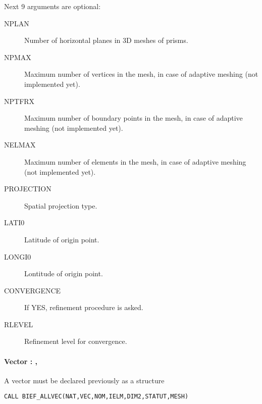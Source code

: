 Next 9 arguments are optional:
\begin{description}
\item [NPLAN] Number of horizontal planes in 3D meshes of prisms.
\item [NPMAX] Maximum number of vertices in the mesh, in case of adaptive
  meshing (not implemented yet).
\item [NPTFRX] Maximum number of boundary points in the mesh, in case of
  adaptive meshing (not implemented yet).
\item [NELMAX] Maximum number of elements in the mesh, in case of adaptive
  meshing (not implemented yet). 
\item [PROJECTION] Spatial projection type.
\item [LATI0] Latitude of origin point.
\item [LONGI0] Lontitude of origin point.
\item [CONVERGENCE] If YES, refinement procedure is asked.
\item [RLEVEL] Refinement level for convergence.
\end{description}

\paragraph{Vector :  , }

A vector must be declared previously as a  structure

\begin{lstlisting}[language=TelFortran]
CALL BIEF_ALLVEC(NAT,VEC,NOM,IELM,DIM2,STATUT,MESH)
\end{lstlisting}

